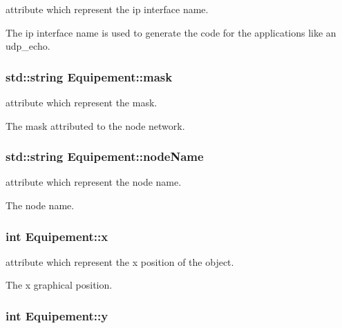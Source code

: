 attribute which represent the ip interface name. 

The ip interface name is used to generate the code for the applications like an udp\_\-echo. \hypertarget{class_equipement_bc9e4c10eacad003427f4812890c7d52}{
\subsubsection[{mask}]{\setlength{\rightskip}{0pt plus 5cm}std::string {\bf Equipement::mask}}}
\label{class_equipement_bc9e4c10eacad003427f4812890c7d52}


attribute which represent the mask. 

The mask attributed to the node network. \hypertarget{class_equipement_c83d966d9331f8b92ffa09b5eaf05816}{
\subsubsection[{nodeName}]{\setlength{\rightskip}{0pt plus 5cm}std::string {\bf Equipement::nodeName}}}
\label{class_equipement_c83d966d9331f8b92ffa09b5eaf05816}


attribute which represent the node name. 

The node name. \hypertarget{class_equipement_45ae2acbe57b1a47e7e9eeed67738109}{
\subsubsection[{x}]{\setlength{\rightskip}{0pt plus 5cm}int {\bf Equipement::x}}}
\label{class_equipement_45ae2acbe57b1a47e7e9eeed67738109}


attribute which represent the x position of the object. 

The x graphical position. \hypertarget{class_equipement_de92f12b5da5dde6f2b43921789cf676}{
\subsubsection[{y}]{\setlength{\rightskip}{0pt plus 5cm}int {\bf Equipement::y}}}
\label{class_equipement_de92f12b5da5dde6f2b43921789cf676}


